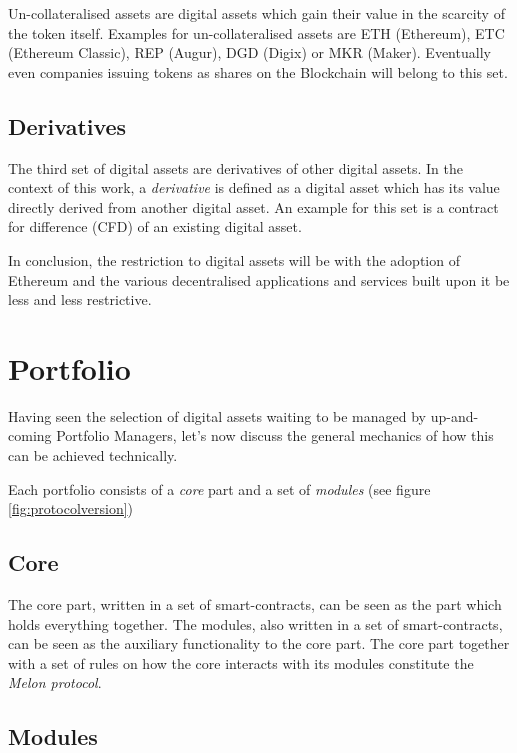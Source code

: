 \documentclass[9pt,oneside]{amsart}
\theoremstyle{plain}
\begin{document}
\begin{multicols}{2}
Un-collateralised assets are digital assets which gain their value in the scarcity of the token itself.
Examples for un-collateralised assets are ETH (Ethereum\cite{ethereum}), ETC (Ethereum Classic\cite{ethereumclassic}), REP (Augur\cite{augur}), DGD (Digix\cite{digix}) or MKR (Maker\cite{makerdao}). Eventually even companies issuing tokens as shares on the Blockchain will belong to this set.

\subsection{Derivatives}\label{sub:derivatives}

The third set of digital assets are derivatives of other digital assets. In the context of this work, a \textit{derivative} is defined as a digital asset which has its value directly derived from another digital asset.
An example for this set is a contract for difference (CFD) of an existing digital asset.

In conclusion, the restriction to digital assets will be with the adoption of Ethereum and the various decentralised applications and services built upon it be less and less restrictive.

\section{Portfolio}\label{sec:portfolio}

Having seen the selection of digital assets waiting to be managed by up-and-coming Portfolio Managers, let's now discuss the general mechanics of how this can be achieved technically.

Each portfolio consists of a \textit{core} part and a set of \textit{modules} (see figure \ref{fig:protocolversion})

\subsection{Core}\label{sub:core}

The core part, written in a set of smart-contracts, can be seen as the part which holds everything together. The modules, also written in a set of smart-contracts, can be seen as the auxiliary functionality to the core part. The core part together with a set of rules on how the core interacts with its modules constitute the \textit{Melon protocol}.

\subsection{Modules}\label{sub:modules}


\end{multicols}
\end{document}
